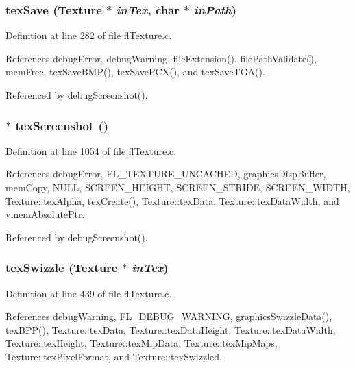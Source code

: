 \subsubsection{ tex\-Save ({\bf Texture} $\ast$ {\em in\-Tex}, char $\ast$ {\em in\-Path})}\label{flTexture_8h_42ef43dc0bebab5c836db2e1b9ec0962}




Definition at line 282 of file fl\-Texture.c.

References debug\-Error, debug\-Warning, file\-Extension(), file\-Path\-Validate(), mem\-Free, tex\-Save\-BMP(), tex\-Save\-PCX(), and tex\-Save\-TGA().

Referenced by debug\-Screenshot().
\subsubsection{$\ast$ tex\-Screenshot ()}\label{flTexture_8h_bba74e07093e026798aa20f44a390610}




Definition at line 1054 of file fl\-Texture.c.

References debug\-Error, FL\_\-TEXTURE\_\-UNCACHED, graphics\-Disp\-Buffer, mem\-Copy, NULL, SCREEN\_\-HEIGHT, SCREEN\_\-STRIDE, SCREEN\_\-WIDTH, Texture::tex\-Alpha, tex\-Create(), Texture::tex\-Data, Texture::tex\-Data\-Width, and vmem\-Absolute\-Ptr.

Referenced by debug\-Screenshot().
\subsubsection{ tex\-Swizzle ({\bf Texture} $\ast$ {\em in\-Tex})}\label{flTexture_8h_30b31c0af73bf82ad9236a981a812eec}




Definition at line 439 of file fl\-Texture.c.

References debug\-Warning, FL\_\-DEBUG\_\-WARNING, graphics\-Swizzle\-Data(), tex\-BPP(), Texture::tex\-Data, Texture::tex\-Data\-Height, Texture::tex\-Data\-Width, Texture::tex\-Height, Texture::tex\-Mip\-Data, Texture::tex\-Mip\-Maps, Texture::tex\-Pixel\-Format, and Texture::tex\-Swizzled.


